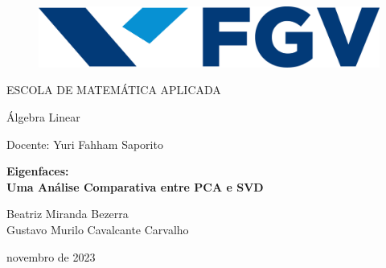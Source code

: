 \begin{titlepage}

    \begin{figure}
        \centering
        \includegraphics[scale = 0.5]{FGV_logo}\label{fig:figure}
    \end{figure}

    {\selectfont
    
    \begin{center}
        \vspace*{0.5cm}
        \scshape {\Large ESCOLA DE MATEMÁTICA APLICADA}

        \vspace*{3cm}
        {\Large Álgebra Linear}

        \vspace*{0.5cm}
        {\Large Docente: Yuri Fahham Saporito}

        \vspace*{2cm}
        \doublespacing
        \textbf {\LARGE Eigenfaces: \\ Uma Análise Comparativa entre PCA e SVD}

        \vspace*{3cm}
        {\Large Beatriz Miranda Bezerra \\Gustavo Murilo Cavalcante Carvalho}


        \vspace*{5cm}
        {\large novembro de 2023}
    \end{center}
    }

\end{titlepage}